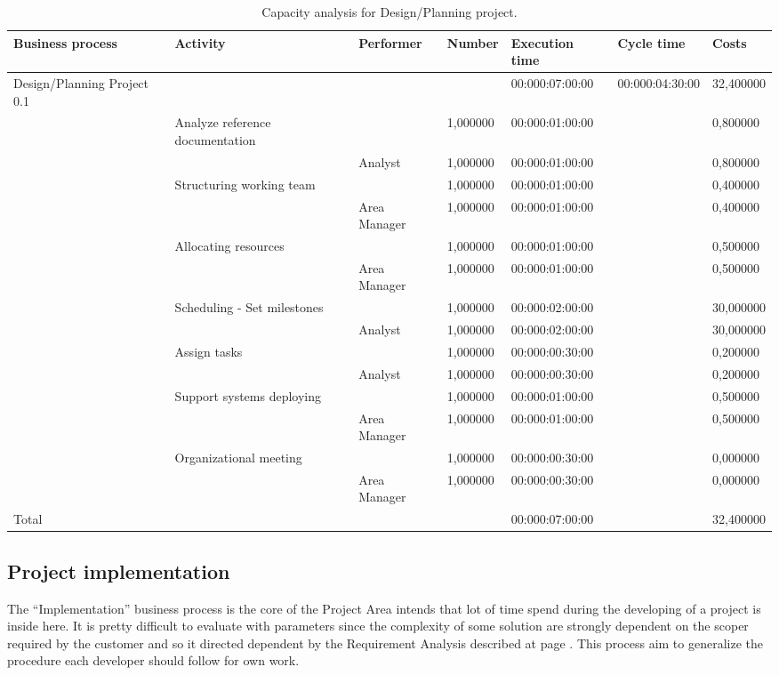 \begin{landscape}
\begin{table}
\centering
{\tiny
\begin{tabular}{|l|l|l|l|l|l|l|}
Business process&Activity&Performer&Number&Execution time&Cycle time&Costs\\
\hline
Design/Planning Project 0.1&&&&00:000:07:00:00&00:000:04:30:00&32,400000\\
\hline
&Analyze reference documentation &&1,000000&00:000:01:00:00&&0,800000\\
\hline
&&Analyst &1,000000&00:000:01:00:00&&0,800000\\
\hline
&Structuring working team &&1,000000&00:000:01:00:00&&0,400000\\
\hline
&&Area Manager &1,000000&00:000:01:00:00&&0,400000\\
\hline
&Allocating resources &&1,000000&00:000:01:00:00&&0,500000\\
\hline
&&Area Manager &1,000000&00:000:01:00:00&&0,500000\\
\hline
&Scheduling - Set milestones &&1,000000&00:000:02:00:00&&30,000000\\
\hline
&&Analyst &1,000000&00:000:02:00:00&&30,000000\\
\hline
&Assign tasks &&1,000000&00:000:00:30:00&&0,200000\\
\hline
&&Analyst &1,000000&00:000:00:30:00&&0,200000\\
\hline
&Support systems deploying &&1,000000&00:000:01:00:00&&0,500000\\
\hline
&&Area Manager &1,000000&00:000:01:00:00&&0,500000\\
\hline
&Organizational meeting &&1,000000&00:000:00:30:00&&0,000000\\
\hline
&&Area Manager &1,000000&00:000:00:30:00&&0,000000\\
\hline
Total&&&&00:000:07:00:00&&32,400000
\end{tabular}
}
\caption{Capacity analysis for Design/Planning project.}
\end{table}
\end{landscape}
%

%

\subsection{Project implementation}
The ``Implementation'' business process is the core of the Project Area intends that lot of time spend during the developing of a project is inside here. It is pretty difficult to evaluate with parameters since the complexity of some solution are strongly dependent on the scoper required by the customer and so it directed dependent by the Requirement Analysis described at page \pageref{subsec:requirement}. This process aim to generalize the procedure each developer should follow for own work.

